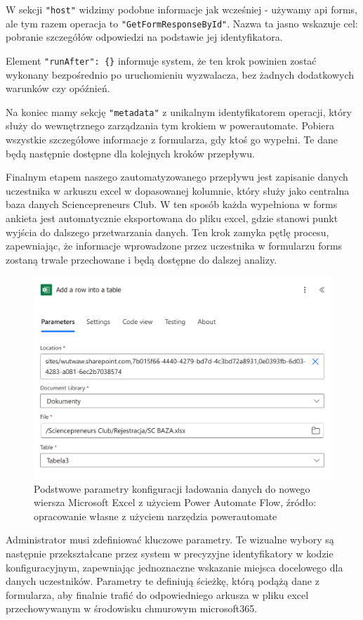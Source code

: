 W sekcji \texttt{"host"} widzimy podobne informacje jak wcześniej - używamy \gls{api} \gls{forms}, ale tym razem operacja to \texttt{"GetFormResponseById"}. Nazwa ta jasno wskazuje cel: pobranie szczegółów odpowiedzi na podstawie jej identyfikatora.

Element \verb|"runAfter": {}| informuje system, że ten krok powinien zostać wykonany bezpośrednio po uruchomieniu wyzwalacza, bez żadnych dodatkowych warunków czy opóźnień.

Na koniec mamy sekcję \texttt{"metadata"} z unikalnym identyfikatorem operacji, który służy do wewnętrznego zarządzania tym krokiem w \gls{powerautomate}. Pobiera wszystkie szczegółowe informacje z formularza, gdy ktoś go wypełni. Te dane będą następnie dostępne dla kolejnych kroków przepływu.

Finalnym etapem naszego zautomatyzowanego przepływu jest zapisanie danych uczestnika w arkuszu \gls{excel} w dopasowanej kolumnie, który służy jako centralna baza danych Sciencepreneurs Club. W ten sposób każda wypełniona w \gls{forms} ankieta jest automatycznie eksportowana do pliku \gls{excel}, gdzie stanowi punkt wyjścia do dalszego przetwarzania danych. Ten krok zamyka pętlę procesu, zapewniając, że informacje wprowadzone przez uczestnika w formularzu \gls{forms} zostaną trwale przechowane i będą dostępne do dalszej analizy.

\begin{figure}[!hb]
	\centering \includegraphics[width=0.7\linewidth]{rysunki/DodanieWiersza.png}
	\caption{Podstwowe parametry konfiguracji ładowania danych do nowego wiersza Microsoft Excel z użyciem Power Automate Flow, źródło: opracowanie własne z użyciem narzędzia \gls{powerautomate}}
\end{figure}

Administrator musi zdefiniować kluczowe parametry. Te wizualne wybory są następnie przekształcane przez system w precyzyjne identyfikatory w kodzie konfiguracyjnym, zapewniając jednoznaczne wskazanie miejsca docelowego dla danych uczestników. Parametry te definiują ścieżkę, którą podążą dane z formularza, aby finalnie trafić do odpowiedniego arkusza w pliku \gls{excel} przechowywanym w środowisku chmurowym \gls{microsoft365}.

